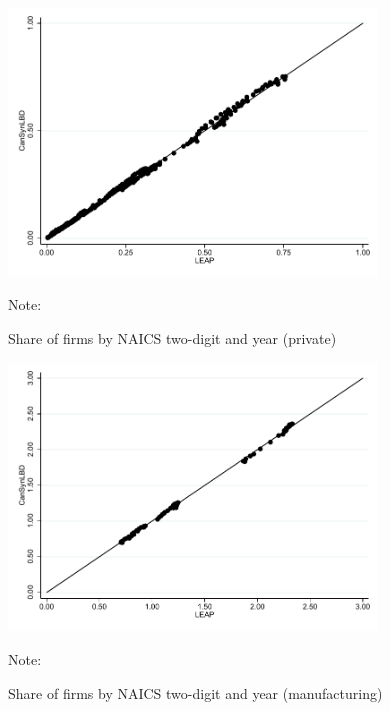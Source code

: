 \documentclass{article}
\begin{document}
\begin{figure} [H]
\centering
\caption{Share of firms by NAICS two-digit and year (private)} \label{FirmSharePrivate}
\includegraphics[height=2.8in, width=.7\linewidth]{graphs/Share_of_firms_by_NAICS_two-digit_and_year_private_bw.pdf} 
\begin{minipage}{0.85\textwidth}
{\footnotesize Note: \TableNote \par}
\end{minipage}
\end{figure}


\vspace{-15.5pt}
\begin{figure} [H]
\centering
\caption{Share of firms by NAICS two-digit and year (manufacturing)} \label{FirmShareManufacturing}
\includegraphics[height=2.8in, width=.7\linewidth]{graphs/Share_of_firms_by_NAICS_two-digit_and_year_Manufacturing_bw.pdf} 
\begin{minipage}{0.85\textwidth}
{\footnotesize Note: \TableNote \par}
\end{minipage}
\end{figure}
\end{document}
